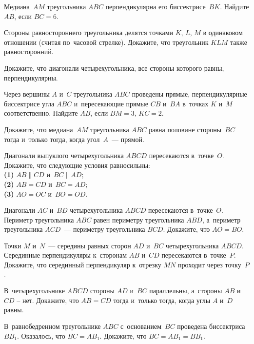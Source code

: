 \begin{problems}

\item
Медиана~$AM$ треугольника $ABC$ перпендикулярна его биссектрисе~$BK$.
Найдите $AB$, если $BC = 6$.


\item
Стороны равностороннего треугольника делятся точками $K$, $L$, $M$
в одинаковом отношении (считая по~часовой стрелке).
Докажите, что треугольник $KLM$ также равносторонний.

\item
Докажите, что диагонали четырехугольника, все стороны которого равны,
перпендикулярны.

\item
Через вершины $A$ и~$C$ треугольника $ABC$ проведены прямые, перпендикулярные
биссектрисе угла $ABC$ и~пересекающие прямые $CB$ и~$BA$ в~точках $K$ и~$M$
соответственно.
Найдите $AB$, если $BM = 3$, $KC = 2$.

\item
Докажите, что медиана~$AM$ треугольника $ABC$ равна половине стороны~$BC$ тогда
и~только тогда, когда угол~$A$~--- прямой.

\item
Диагонали выпуклого четырехугольника $ABCD$ пересекаются в~точке~$O$.
Докажите, что следующие условия равносильны:
\\
\textbf{(1)}\enspace
$AB \parallel CD$ и~$BC \parallel AD$;
\\
\textbf{(2)}\enspace
$AB = CD$ и~$BC = AD$;
\\
\textbf{(3)}\enspace
$AO = OC$ и~$BO = OD$.

\item
Диагонали $AC$ и~$BD$ четырехугольника $ABCD$ пересекаются в~точке~$O$.
Периметр треугольника $ABC$ равен периметру треугольника $ABD$, а~периметр
треугольника $ACD$~--- периметру треугольника $BCD$.
Докажите, что $AO = BO$.

\item
Точки $M$ и~$N$~--- середины равных сторон $AD$ и~$BC$ четырехугольника $ABCD$.
Серединные перпендикуляры к~сторонам $AB$ и~$CD$ пересекаются в~точке~$P$.
Докажите, что серединный перпендикуляр к~отрезку $MN$ проходит через точку~$P$.

\item
В~четырехугольнике $ABCD$ стороны $AD$ и~$BC$ параллельны, а~стороны $AB$
и~$CD$ -- нет.
Докажите, что $AB = CD$ тогда и~только тогда, когда углы $A$ и~$D$ равны.

\item
В~равнобедренном треугольнике $ABC$ с~основанием~$BC$ проведена
биссектриса~$B B_1$.
Оказалось, что $BC = A B_1$.
Докажите, что $BC = A B_1 = B B_1$.

\end{problems}

